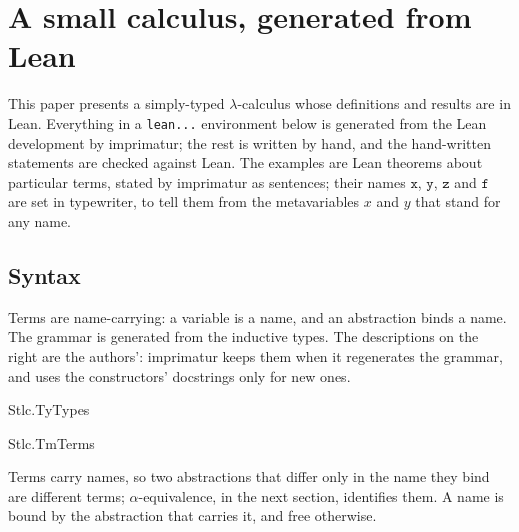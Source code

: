 \documentclass{article}
\begin{document}
\section{A small calculus, generated from Lean}

This paper presents a simply-typed $\lambda$-calculus whose definitions and
results are in Lean. Everything in a \texttt{lean...} environment below is
generated from the Lean development by imprimatur; the rest is written by
hand, and the hand-written statements are checked against Lean. The
examples are Lean theorems about particular terms, stated by imprimatur as
sentences; their names $\mathtt{x}$, $\mathtt{y}$, $\mathtt{z}$ and
$\mathtt{f}$ are set in typewriter, to tell them from the metavariables $x$
and $y$ that stand for any name.

\subsection{Syntax}

Terms are name-carrying: a variable is a name, and an abstraction binds a
name. The grammar is generated from the inductive types. The descriptions on
the right are the authors': imprimatur keeps them when it regenerates the
grammar, and uses the constructors' docstrings only for new ones.

\begin{leangrammar}[sum=-gvNYDo1w4, dflt=VDpvVT8fbS]{Stlc.Ty}{Types}
\label{gram:Stlc.Ty}\begin{LeanGrammar}
\end{LeanGrammar}
\end{leangrammar}

\begin{leangrammar}[sum=FuF0yc-Xpz, dflt=Z7b8j8i4cU]{Stlc.Tm}{Terms}
\label{gram:Stlc.Tm}\begin{LeanGrammar}
\end{LeanGrammar}
\end{leangrammar}

Terms carry names, so two abstractions that differ only in the name they bind
are different terms; $\alpha$-equivalence, in the next section, identifies
them. A name is bound by the abstraction that carries it, and free otherwise.
\end{document}
